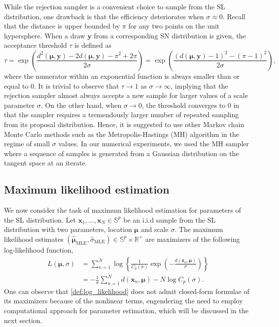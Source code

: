 \documentclass[10pt]{article}
\newcommand{\bfx}{\mathbf{x}}
\newcommand{\bfy}{\mathbf{y}}
\newcommand{\bfmu}{\boldsymbol{\mu}}
\newcommand{\bbS}{\mathbb{S}}
\newcommand{\bbRpos}{\mathbb{R}^+}
\newcommand{\mleloc}{\hat{\bfmu}_{\textrm{MLE}}}
\newcommand{\mlescale}{\hat{\sigma}_{\textrm{MLE}}}
\begin{document}
While the rejection sampler is a convenient choice to sample from the SL distribution, one drawback is that the efficiency deteriorates when $\sigma \approx 0$. Recall that the distance is upper bounded by $\pi$ for any two points on the unit hypersphere. When a draw $\bfy$ from a corresponding SN distribution is given, the acceptance threshold $\tau$ is defined as 
\begin{equation*}
\tau = \exp\left( \frac{d^2(\bfmu,\bfy)-2d(\bfmu,\bfy) - \pi^2+2\pi}{2\sigma}\right) = \exp\left(\frac{(d(\bfmu,\bfy)-1)^2 - (\pi-1)^2}{2\sigma}\right),
\end{equation*}
where the numerator within an exponential function is always smaller than or equal to 0. It is trivial to observe that $\tau \rightarrow 1$ as $\sigma \rightarrow \infty$, implying that the rejection sampler almost always accepts a new sample for larger values of a scale parameter $\sigma$. On the other hand, when $\sigma \rightarrow 0$, the threshold converges to 0 in that the sampler requires a tremendously larger number of repeated sampling from its proposal distribution. Hence, it is suggested to use other Markov chain Monte Carlo methods such as the Metropolis-Hastings (MH) algorithm \cite{metropolis_1953_EquationStateCalculations, hastings_1970_MonteCarloSampling} in the regime of small $\sigma$ values. In our numerical experiments, we used the MH sampler where a sequence of samples is generated from a Gaussian distribution on the tangent space at an iterate. 


\subsection{Maximum likelihood estimation}

We now consider the task of maximum likelihood estimation for parameters of the SL distribution. Let $ \bfx_1, \ldots, \bfx_N \in \bbS^p$ be an i.i.d sample from the SL distribution with two parameters,  location $\bfmu$ and scale $\sigma$. The maximum likelihood estimates $(\mleloc, \mlescale) \in \bbS^p \times \bbRpos$ are maximizers of the following log-likelihood function,
\begin{equation}\label{def:log_likelihood}
\begin{split}
L(\bfmu, \sigma) &= \sum_{n=1}^N  \log \left\lbrace \frac{1}{C_p(\sigma)} \exp \left(-\frac{d(\bfx_n,\bfmu)}{\sigma}\right)\right\rbrace\\ 
&= -\frac{1}{\sigma }\sum_{n=1}^N d(\bfx_n, \bfmu) - N \log C_p (\sigma).
\end{split}
\end{equation}
One can observe that \eqref{def:log_likelihood} does not admit closed-form formulae of its maximizers because of the nonlinear terms, engendering the need to employ computational approach for parameter estimation, which will be discussed in the next section.
\end{document}
